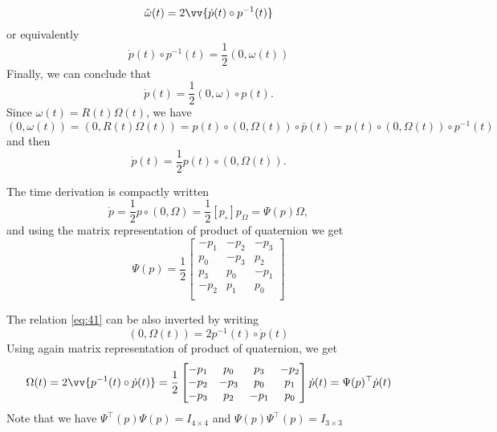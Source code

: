 \begin{equation}
  \label{eq:37}
  \tilde \omega(t) = 2 \vv{ \dot p(t) \circ p^{-1}(t) } 
\end{equation}
or equivalently
\begin{equation}
  \dot p(t) \circ p^{-1}(t) = \frac 1 2 (0, \omega(t) )
  \label{eq:38}
\end{equation}
Finally, we can conclude that
\begin{equation}
  \label{eq:39}
  \dot p(t) =\frac 1 2 (0, \omega ) \circ p(t).
\end{equation}
Since $\omega(t)=R(t)\Omega(t)$, we have
\begin{equation}
  \label{eq:40}
  (0, \omega(t) ) = (0, R(t) \Omega(t) ) = p(t) \circ (0, \Omega(t) ) \circ \bar p(t) = p(t) \circ (0, \Omega(t) ) \circ  p^{-1}(t)
\end{equation}
and then
\begin{equation}
  \label{eq:41}
  \dot p(t) =\frac 1 2 p(t) \circ(0, \Omega(t) ) .
\end{equation}

The time derivation is compactly written
\begin{equation}
  \label{eq:3}
  \dot p = \frac  1 2 p  \circ(0, \Omega ) = \frac 1 2 [p_\circ] p_{\Omega} =  \Psi(p)\Omega ,
\end{equation}
and using the matrix representation of product of  quaternion
we get
\begin{equation}
  \label{eq:27}
  \Psi(p) = \frac  1 2  \begin{bmatrix}
    -p_1 & -p_2 & -p_3 \\
    p_0 & -p_3 & p_2 \\
    p_3 & p_0 & -p_1 \\
    -p_2 & p_1 & p_0 \\
  \end{bmatrix}
\end{equation}

The relation \eqref{eq:41} can be also inverted by writing
\begin{equation}
  \label{eq:42}
   (0, \Omega(t) ) = 2 p^{-1}(t) \circ \dot p(t)
\end{equation}
Using again  matrix representation of product of  quaternion, we get 
\begin{equation}
  \label{eq:42}
  \Omega(t)  = 2 \vv{p^{-1}(t) \circ \dot p(t)}  = \frac  1 2  \begin{bmatrix}
    -p_1 & p_0 & p_3 & -p_2 \\
    -p_2 & -p_3 & p_0 & p_1 \\
    -p_3 & p_2 & -p_1  & p_0\\
  \end{bmatrix}\dot p(t) = \Psi(p)^\top \dot p(t)
\end{equation}
Note that we have $\Psi^\top(p)\Psi(p)= I_{4\times 4 }$ and  $\Psi(p)\Psi^\top(p)= I_{3\times 3 }$ 
